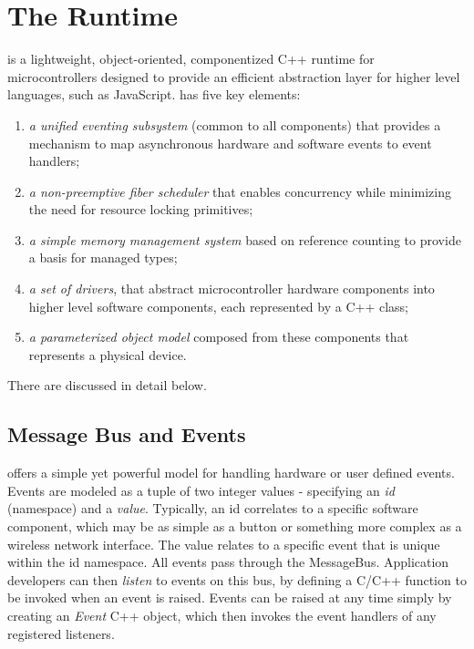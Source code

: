 \section{The \CO Runtime}
\label{sec:codal}

\CO is a lightweight, object-oriented, componentized C++ runtime for microcontrollers designed to provide an efficient abstraction layer for higher level languages, such as JavaScript. \CO has five key elements:

\begin{enumerate}
\item \emph{a unified eventing subsystem} (common to all components) that provides a mechanism to map asynchronous hardware and software events to event handlers;
\item \emph{a non-preemptive fiber scheduler} that enables concurrency while minimizing the need for resource locking primitives;
\item \emph{a simple memory management system} based on reference counting to provide a basis for managed types;
\item \emph{a set of drivers}, that abstract microcontroller hardware components into higher level software components, each represented by a C++ class;
\item \emph{a parameterized object model} composed from these components that represents a physical device.
\end{enumerate}

There are discussed in detail below.

\subsection{Message Bus and Events}

\CO offers a simple yet powerful model for handling hardware or user defined events. Events are modeled as a tuple of two integer values - specifying an \emph{id} (namespace) and a \emph{value}.
Typically, an id correlates to a specific software component, which may be as simple as a button or something more complex as a wireless network interface. The value relates to a specific event that is unique within the id namespace. All events pass through the \CO MessageBus. Application developers can then \emph{listen} to events on this bus, by defining a C/C++ function to be invoked when an event is raised. Events can be raised at any time simply by creating an \emph{Event} C++ object, which then invokes the event handlers of any registered listeners.

